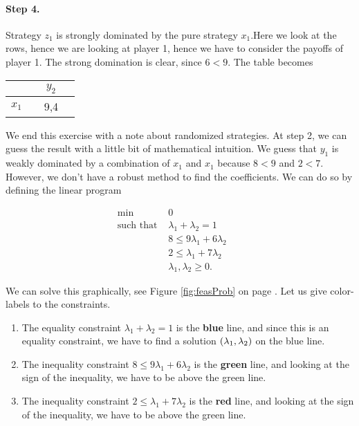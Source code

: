 \paragraph{Step 4.} Strategy $z_{1}$ is strongly dominated by the pure strategy $x_{1}$.Here we look at the rows, hence we are looking at player 1, hence we have to consider the payoffs of player 1. The strong domination is clear, since $6 < 9$. The table becomes

\begin{tabular}[h!]{l|ccc}
		&& $y_2$ \\
		\hline
		$x_1$ && 9,4 &
	\end{tabular} 
	

\vspace{10mm}

We end this exercise with a note about randomized strategies. At step 2, we can guess the result with a little bit of mathematical intuition. We guess that $y_1$ is weakly dominated by a combination of $x_{1}$ and $x_{1}$ because $8 < 9$ and $2 < 7$. However, we don't have a robust method to find the coefficients. We can do so by defining the linear program


        

	\begin{equation*}
    \begin{aligned}
    \underset{}{\text{min }} &
    0 & & \\
    \text{such that  } &
        \lambda_{1} + \lambda_{2} = 1 & \\
        & 8 \leq 9 \lambda_{1} + 6 \lambda_{2} &  \\
        & 2 \leq \lambda_{1} + 7 \lambda_{2} & \\
        & \lambda_{1}, \lambda_{2} \geq 0. &
    \end{aligned}
    \end{equation*}
   

We can solve this graphically, see Figure \ref{fig:feasProb} on page \pageref{fig:feasProb}. Let us give color-labels to the constraints.
\begin{enumerate}
    \item The equality constraint $\lambda_{1} + \lambda_{2} = 1$ is the \textbf{blue} line, and since this is an equality constraint, we have to find a solution $\left(\lambda_{1}, \lambda_{2}\right)$ on the blue line.
    \item The inequality constraint $8 \leq 9 \lambda_{1} + 6 \lambda_{2}$ is the \textbf{green} line, and looking at the sign of the inequality, we have to be above the green line.
    \item The inequality constraint $2 \leq \lambda_{1} + 7 \lambda_{2}$ is the \textbf{red} line, and looking at the sign of the inequality, we have to be above the green line.
\end{enumerate}


